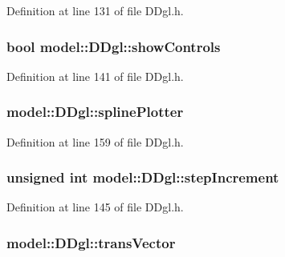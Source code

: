 Definition at line 131 of file D\+Dgl.\+h.

\hypertarget{structmodel_1_1_d_dgl_a57653bea5d1a5c1d8f4af028cb8941c8}{}
\subsubsection[{show\+Controls}]{\setlength{\rightskip}{0pt plus 5cm}bool model\+::\+D\+Dgl\+::show\+Controls}\label{structmodel_1_1_d_dgl_a57653bea5d1a5c1d8f4af028cb8941c8}


Definition at line 141 of file D\+Dgl.\+h.

\hypertarget{structmodel_1_1_d_dgl_af05c4dbe1ad669b46b81d7fc6d821f5a}{}
\subsubsection[{spline\+Plotter}]{ model\+::\+D\+Dgl\+::spline\+Plotter}\label{structmodel_1_1_d_dgl_af05c4dbe1ad669b46b81d7fc6d821f5a}


Definition at line 159 of file D\+Dgl.\+h.

\hypertarget{structmodel_1_1_d_dgl_a42d69fd8a14c2b6333f157c39621cdfd}{}
\subsubsection[{step\+Increment}]{\setlength{\rightskip}{0pt plus 5cm}unsigned int model\+::\+D\+Dgl\+::step\+Increment}\label{structmodel_1_1_d_dgl_a42d69fd8a14c2b6333f157c39621cdfd}


Definition at line 145 of file D\+Dgl.\+h.

\hypertarget{structmodel_1_1_d_dgl_a1572b928baa53075414bcf155ac90b71}{}
\subsubsection[{trans\+Vector}]{ model\+::\+D\+Dgl\+::trans\+Vector}\label{structmodel_1_1_d_dgl_a1572b928baa53075414bcf155ac90b71}


